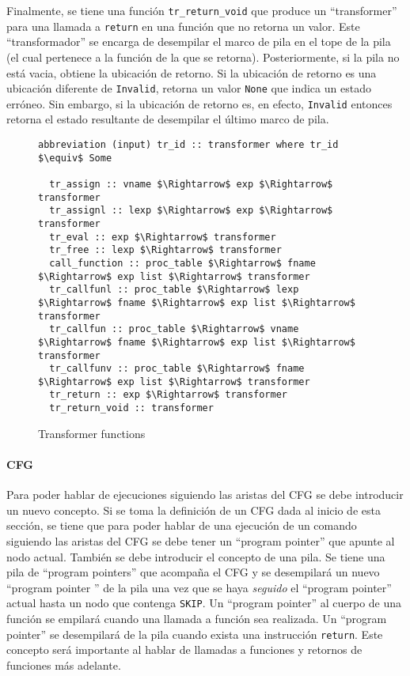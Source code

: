 Finalmente, se tiene una función \verb|tr_return_void| que produce un ``transformer'' para una llamada a \verb|return| en una función que no retorna un valor.
Este ``transformador'' se encarga de desempilar el marco de pila en el tope de la pila (el cual pertenece a la función de la que se retorna).
Posteriormente, si la pila no está vacia, obtiene la ubicación de retorno.
Si la ubicación de retorno es una ubicación diferente de \verb|Invalid|, retorna un valor \verb|None| que indica un estado erróneo.
Sin embargo, si la ubicación de retorno es, en efecto, \verb|Invalid| entonces retorna el estado resultante de desempilar el último marco de pila.

\begin{comment}
FIXME
\end{comment}

\begin{figure}
  \begin{lstlisting}[frame=single, mathescape=true]
  abbreviation (input) tr_id :: transformer where tr_id $\equiv$ Some

  tr_assign :: vname $\Rightarrow$ exp $\Rightarrow$ transformer
  tr_assignl :: lexp $\Rightarrow$ exp $\Rightarrow$ transformer
  tr_eval :: exp $\Rightarrow$ transformer
  tr_free :: lexp $\Rightarrow$ transformer
  call_function :: proc_table $\Rightarrow$ fname $\Rightarrow$ exp list $\Rightarrow$ transformer
  tr_callfunl :: proc_table $\Rightarrow$ lexp $\Rightarrow$ fname $\Rightarrow$ exp list $\Rightarrow$ transformer
  tr_callfun :: proc_table $\Rightarrow$ vname $\Rightarrow$ fname $\Rightarrow$ exp list $\Rightarrow$ transformer
  tr_callfunv :: proc_table $\Rightarrow$ fname $\Rightarrow$ exp list $\Rightarrow$ transformer
  tr_return :: exp $\Rightarrow$ transformer
  tr_return_void :: transformer
  \end{lstlisting}

  \caption{Transformer functions}
  \label{fig:transformer_def}
\end{figure}


\paragraph*{CFG}

Para poder hablar de ejecuciones siguiendo las aristas del CFG se debe introducir un nuevo concepto.
Si se toma la definición de un CFG dada al inicio de esta sección, se tiene que para poder hablar de una ejecución de un comando siguiendo las aristas del CFG se debe tener un ``program pointer'' que apunte al nodo actual.
También se debe introducir el concepto de una pila.
Se tiene una pila de ``program pointers'' que acompaña el CFG y se desempilará un nuevo ``program pointer '' de la pila una vez que se haya \textit{seguido} el ``program pointer'' actual hasta un nodo que contenga \verb|SKIP|.
Un ``program pointer'' al cuerpo de una función se empilará cuando una llamada a función sea realizada.
Un ``program pointer'' se desempilará de la pila cuando exista una instrucción \verb|return|.
Este concepto será importante al hablar de llamadas a funciones y retornos de funciones más adelante.

